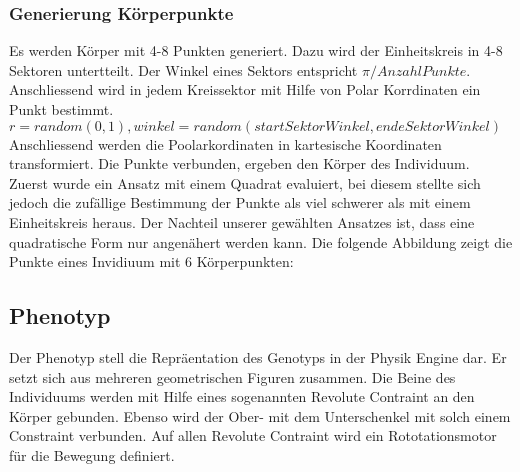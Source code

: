       \subsubsection{Generierung Körperpunkte\label{subsub:GenotypGenerierungKörperpunkte}}
        Es werden Körper mit 4-8 Punkten generiert. Dazu wird der Einheitskreis in 4-8 Sektoren untertteilt.
        Der Winkel eines Sektors entspricht \(\pi / Anzahl Punkte\). \\
        Anschliessend wird in jedem Kreissektor mit Hilfe von Polar Korrdinaten ein Punkt bestimmt. \\
        \( r = random (0, 1), winkel = random(startSektorWinkel, endeSektorWinkel ) \)
        Anschliessend werden die Poolarkordinaten in kartesische Koordinaten transformiert.
        Die Punkte verbunden, ergeben den Körper des Individuum. \\
        Zuerst wurde ein Ansatz mit einem Quadrat evaluiert, bei diesem stellte sich jedoch die zufällige Bestimmung
        der Punkte als viel schwerer als mit einem Einheitskreis heraus. Der Nachteil unserer gewählten
        Ansatzes ist, dass eine quadratische Form nur angenähert werden kann.
        Die folgende Abbildung zeigt die Punkte eines Invidiuum mit 6 Körperpunkten: \\

        


  \subsection{Phenotyp\label{sub:Phenotyp}}
    Der Phenotyp stell die Repräentation des Genotyps in der Physik Engine dar.
    Er setzt sich aus mehreren geometrischen Figuren zusammen. Die Beine des Individuums
    werden mit Hilfe eines sogenannten Revolute Contraint an den Körper gebunden.
    Ebenso wird der Ober- mit dem Unterschenkel mit solch einem Constraint verbunden.
    Auf allen Revolute Contraint wird ein Rototationsmotor für die Bewegung definiert.


